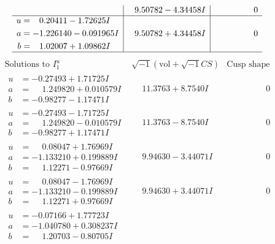 \documentclass[1p]{elsarticle_modified}
\theoremstyle{definition}
\newcommand{\I}{\sqrt{-1}}
\begin{document}
$$\begin{array}{c|c|c}
 & \phantom{-}9.50782 - 4.34458 I & \phantom{-0.000000 } 0 \\ \hline\begin{aligned}
u &= \phantom{-}0.20411 - 1.72625 I \\
a &= -1.226140 - 0.091965 I \\
b &= \phantom{-}1.02007 + 1.09862 I\end{aligned}
 & \phantom{-}9.50782 + 4.34458 I & \phantom{-0.000000 } 0\\
 \hline 
 \end{array}$$\newpage$$\begin{array}{c|c|c}  
\text{Solutions to }I^u_{1}& \I (\text{vol} + \sqrt{-1}CS) & \text{Cusp shape}\\
 \hline 
\begin{aligned}
u &= -0.27493 + 1.71725 I \\
a &= \phantom{-}1.249820 + 0.010579 I \\
b &= -0.98277 - 1.17471 I\end{aligned}
 & \phantom{-}11.3763 + 8.7540 I & \phantom{-0.000000 } 0 \\ \hline\begin{aligned}
u &= -0.27493 - 1.71725 I \\
a &= \phantom{-}1.249820 - 0.010579 I \\
b &= -0.98277 + 1.17471 I\end{aligned}
 & \phantom{-}11.3763 - 8.7540 I & \phantom{-0.000000 } 0 \\ \hline\begin{aligned}
u &= \phantom{-}0.08047 + 1.76969 I \\
a &= -1.133210 + 0.199889 I \\
b &= \phantom{-}1.12271 - 0.97669 I\end{aligned}
 & \phantom{-}9.94630 - 3.44071 I & \phantom{-0.000000 } 0 \\ \hline\begin{aligned}
u &= \phantom{-}0.08047 - 1.76969 I \\
a &= -1.133210 - 0.199889 I \\
b &= \phantom{-}1.12271 + 0.97669 I\end{aligned}
 & \phantom{-}9.94630 + 3.44071 I & \phantom{-0.000000 } 0 \\ \hline\begin{aligned}
u &= -0.07166 + 1.77723 I \\
a &= -1.040780 + 0.308237 I \\
b &= \phantom{-}1.20703 - 0.80705 I\end{aligned}

\end{array}$$
\end{document}
